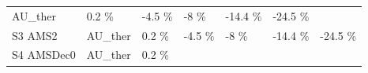 \documentclass[]{article}
\begin{document}
\begin{longtable}[]{@{}lllllll@{}}
\begin{minipage}[t]{0.13\columnwidth}
AU\_ther\strut
\end{minipage} & \begin{minipage}[t]{0.11\columnwidth}\raggedright\strut
0.2 \%\strut
\end{minipage} & \begin{minipage}[t]{0.11\columnwidth}\raggedright\strut
-4.5 \%\strut
\end{minipage} & \begin{minipage}[t]{0.11\columnwidth}\raggedright\strut
-8 \%\strut
\end{minipage} & \begin{minipage}[t]{0.11\columnwidth}\raggedright\strut
-14.4 \%\strut
\end{minipage} & \begin{minipage}[t]{0.11\columnwidth}\raggedright\strut
-24.5 \%\strut
\end{minipage}\tabularnewline
\begin{minipage}[t]{0.14\columnwidth}\raggedright\strut
S3 AMS2\strut
\end{minipage} & \begin{minipage}[t]{0.13\columnwidth}\raggedright\strut
AU\_ther\strut
\end{minipage} & \begin{minipage}[t]{0.11\columnwidth}\raggedright\strut
0.2 \%\strut
\end{minipage} & \begin{minipage}[t]{0.11\columnwidth}\raggedright\strut
-4.5 \%\strut
\end{minipage} & \begin{minipage}[t]{0.11\columnwidth}\raggedright\strut
-8 \%\strut
\end{minipage} & \begin{minipage}[t]{0.11\columnwidth}\raggedright\strut
-14.4 \%\strut
\end{minipage} & \begin{minipage}[t]{0.11\columnwidth}\raggedright\strut
-24.5 \%\strut
\end{minipage}\tabularnewline
\begin{minipage}[t]{0.14\columnwidth}\raggedright\strut
S4 AMSDec0\strut
\end{minipage} & \begin{minipage}[t]{0.13\columnwidth}\raggedright\strut
AU\_ther\strut
\end{minipage} & \begin{minipage}[t]{0.11\columnwidth}\raggedright\strut
0.2 \%\strut
\end{minipage} & \begin{minipage}[t]{0.11\columnwidth}\raggedright\strut

\end{minipage}
\end{longtable}
\end{document}
